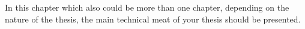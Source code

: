 In this chapter which also could be more than one chapter, depending on the nature of the thesis, the main technical meat of your thesis should be presented.
